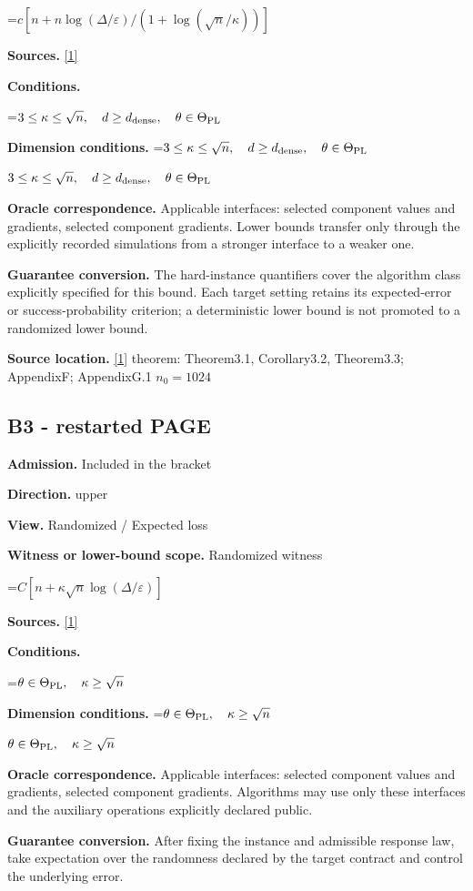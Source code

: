 \documentclass[10pt,a4paper]{article}
\newcommand{\AtlasMath}[1]{\par\begingroup\centering\setbox0=\hbox{$\displaystyle #1$}\ifdim\wd0>1.4\linewidth\typeout{ATLAS WIDE FORMULA: \the\wd0}\fi\ifdim\wd0>\linewidth\resizebox{\linewidth}{!}{\box0}\else\box0\fi\par\endgroup}
\newcommand{\AtlasInlineMath}[1]{\begingroup\setbox0=\hbox{$#1$}\ifdim\wd0>.4\linewidth\endgroup\AtlasMath{#1}\else\endgroup$#1$\fi}
\begin{document}
\AtlasMath{c[n+n\log(\Delta/\varepsilon)/(1+\log(\sqrt n/\kappa))]}
\textbf{Sources.} \href{https://arxiv.org/pdf/2609.00045v3}{[1]}

\textbf{Conditions.} 
\AtlasMath{3\le\kappa\le\sqrt n,\quad d\ge d_{\rm dense},\quad\theta\in\Theta_{\rm PL}}


\textbf{Dimension conditions.} \AtlasInlineMath{3\le\kappa\le\sqrt n,\quad d\ge d_{\rm dense},\quad\theta\in\Theta_{\rm PL}}

\textbf{Oracle correspondence.} Applicable interfaces: selected component values and gradients, selected component gradients. Lower bounds transfer only through the explicitly recorded simulations from a stronger interface to a weaker one.

\textbf{Guarantee conversion.} The hard-instance quantifiers cover the algorithm class explicitly specified for this bound. Each target setting retains its expected-error or success-probability criterion; a deterministic lower bound is not promoted to a randomized lower bound.

\textbf{Source location.} \href{https://arxiv.org/pdf/2609.00045v3}{[1]} theorem: Theorem3.1, Corollary3.2, Theorem3.3; AppendixF; AppendixG.1 $n_0=1024$

\subsection{B3 - restarted PAGE}
\textbf{Admission.} Included in the bracket

\textbf{Direction.} upper

\textbf{View.} Randomized / Expected loss

\textbf{Witness or lower-bound scope.} Randomized witness

\AtlasMath{C[n+\kappa\sqrt n\log(\Delta/\varepsilon)]}
\textbf{Sources.} \href{https://arxiv.org/pdf/2609.00045v3}{[1]}

\textbf{Conditions.} 
\AtlasMath{\theta\in\Theta_{\rm PL},\quad\kappa\ge\sqrt n}


\textbf{Dimension conditions.} \AtlasInlineMath{\theta\in\Theta_{\rm PL},\quad\kappa\ge\sqrt n}

\textbf{Oracle correspondence.} Applicable interfaces: selected component values and gradients, selected component gradients. Algorithms may use only these interfaces and the auxiliary operations explicitly declared public.

\textbf{Guarantee conversion.} After fixing the instance and admissible response law, take expectation over the randomness declared by the target contract and control the underlying error.
\end{document}
